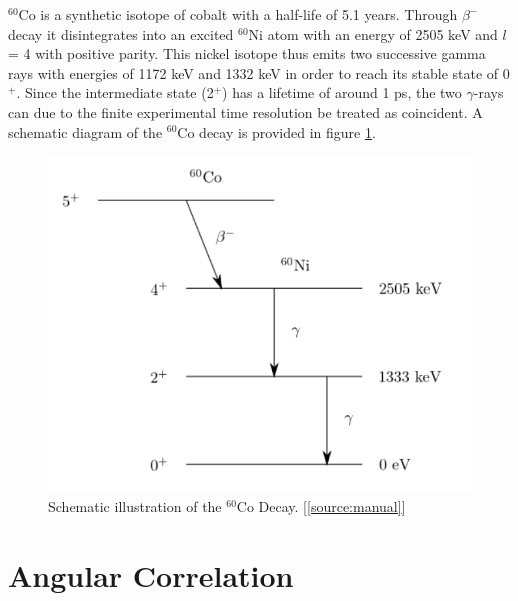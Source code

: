 \documentclass[a4paper,parskip,11pt, DIV12]{scrreprt}
\begin{document}
		$^{60}$Co is a synthetic isotope of cobalt with a half-life of 5.1 years. Through $\beta ^-$ decay it disintegrates into an excited $^{60}$Ni atom with an energy of 2505 keV and $l$ = 4 with positive parity. This nickel isotope thus emits two successive gamma rays with energies of 1172 keV and 1332 keV in order to reach its stable state of 0$^{+}$. Since the intermediate state (2$^+$) has a lifetime of around 1 ps, the two $\gamma$-rays can due to the finite experimental time resolution be treated as coincident. A schematic diagram of the $^{60}$Co decay is provided in figure \ref{fig:CoDecay}.	
\begin{figure}[H]
\centering
\includegraphics[scale=0.65]{60CoDecay.png}
\caption[60CoDecay]{Schematic illustration of the $^{60}$Co Decay. [\ref{source:manual}]}
\label{fig:CoDecay}
\end{figure}
		
\section{Angular Correlation}
\end{document}
